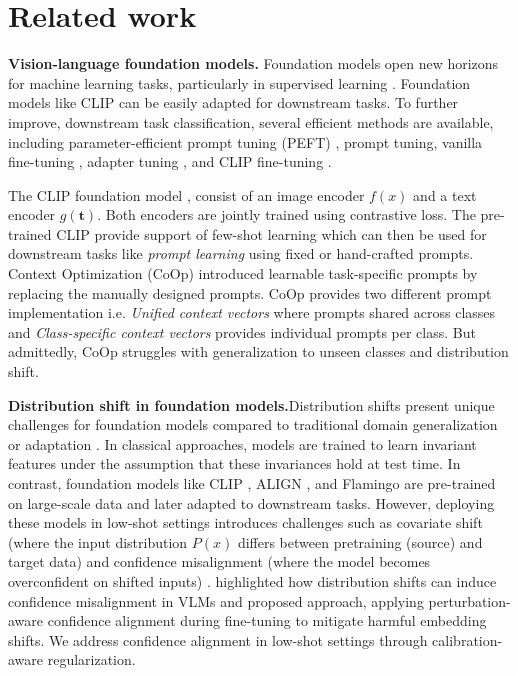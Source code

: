 \section{Related work}
\textbf{Vision-language foundation models.} Foundation models open new horizons for machine learning tasks, particularly in supervised learning \cite{radford2021learning, jia2021scaling}. Foundation models like CLIP can be easily adapted for downstream tasks. To further improve, downstream task classification, several efficient methods are available, including parameter-efficient prompt tuning (PEFT) \cite{zhou2022learning}, prompt tuning, vanilla fine-tuning \cite{khattak2023maple}, adapter tuning \cite{zhang2021tip}, and CLIP fine-tuning \cite{ gao2024clip}. 

The CLIP foundation model  \cite{radford2021learning}, consist of an image encoder \(f(x)\) and a text encoder \(g(\textbf{t})\). Both encoders are jointly trained using contrastive loss. The pre-trained CLIP provide support of few-shot learning which can then be used for downstream tasks like \textit{prompt learning} using fixed or hand-crafted prompts.
Context Optimization (CoOp) \cite{zhou2022learning} introduced learnable task-specific prompts by replacing the manually designed prompts. CoOp provides two different prompt implementation i.e. \textit{Unified context vectors} where prompts shared across classes and \textit{Class-specific context vectors} provides individual prompts per class. But admittedly,  CoOp struggles with generalization to unseen classes and distribution shift.



\noindent
\textbf{Distribution shift in  foundation models.}Distribution shifts present unique challenges for foundation models compared to traditional domain generalization or adaptation \cite{hendrycks2019robustness,wortsman2022robust}. In classical approaches, models are trained to learn invariant features under the assumption that these invariances hold at test time. In contrast, foundation models like CLIP \cite{radford2021learning}, ALIGN \cite{jia2021scaling}, and Flamingo \cite{alayrac2022flamingo} are pre-trained on large-scale data and later adapted to downstream tasks. However, deploying these models in low-shot settings introduces challenges such as covariate shift (where the input distribution \(P(x)\) differs between pretraining (source) and target data) and confidence misalignment (where the model becomes overconfident on shifted inputs) \cite{ wang2023calibration, wang2024understanding,khan2025technical}. \cite{huang2024vaccine} highlighted how distribution shifts can induce confidence misalignment in VLMs and proposed  approach, applying perturbation-aware confidence alignment during fine-tuning to mitigate harmful embedding shifts. We address confidence alignment in low-shot settings through calibration-aware regularization.




